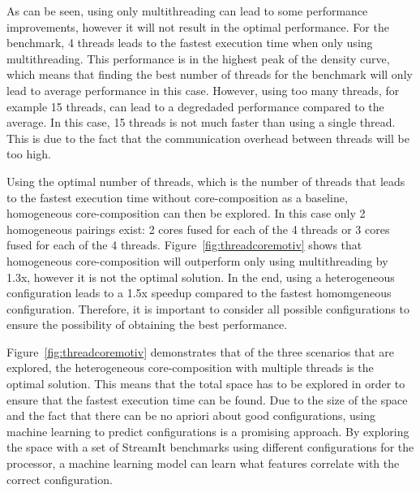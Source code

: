 As can be seen, using only multithreading can lead to some performance improvements, however it will not result in the optimal performance.
For the  benchmark, 4 threads leads to the fastest execution time when only using multithreading.
This performance is in the highest peak of the density curve, which means that finding the best number of threads for the benchmark will only lead to average performance in this case.
However, using too many threads, for example 15 threads, can lead to a degredaded performance compared to the average.
In this case, 15 threads is not much faster than using a single thread.
This is due to the fact that the communication overhead between threads will be too high.

Using the optimal number of threads, which is the number of threads that leads to the fastest execution time without core-composition as a baseline, homogeneous core-composition can then be explored.
In this case only 2 homogeneous pairings exist: 2 cores fused for each of the 4 threads or 3 cores fused for each of the 4 threads.
Figure~\ref{fig:threadcoremotiv} shows that homogeneous core-composition will outperform only using multithreading by 1.3x, however it is not the optimal solution.
In the end, using a heterogeneous configuration leads to a 1.5x speedup compared to the fastest homomgeneous configuration.
Therefore, it is important to consider all possible configurations to ensure the possibility of obtaining the best performance.

Figure~\ref{fig:threadcoremotiv} demonstrates that of the three scenarios that are explored, the heterogeneous core-composition with multiple threads is the optimal solution.
This means that the total space has to be explored in order to ensure that the fastest execution time can be found.
Due to the size of the space and the fact that there can be no apriori about good configurations, using machine learning to predict configurations is a promising approach. %
By exploring the space with a set of StreamIt benchmarks using different configurations for the processor, a machine learning model can learn what features correlate with the correct configuration.

